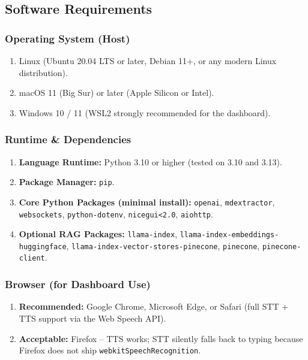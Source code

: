 \documentclass{article}
\begin{document}
\subsection{Software Requirements}

\subsubsection{Operating System (Host)}
\begin{enumerate}[label=\alph*.]
    \item Linux (Ubuntu 20.04 LTS or later, Debian 11+, or any modern Linux distribution).
    \item macOS 11 (Big Sur) or later (Apple Silicon or Intel).
    \item Windows 10 / 11 (WSL2 strongly recommended for the dashboard).
\end{enumerate}

\subsubsection{Runtime \& Dependencies}
\begin{enumerate}[label=\alph*.]
    \item \textbf{Language Runtime:} Python 3.10 or higher (tested on 3.10 and 3.13).
    \item \textbf{Package Manager:} \texttt{pip}.
    \item \textbf{Core Python Packages (minimal install):} \texttt{openai}, \texttt{mdextractor}, \texttt{websockets}, \texttt{python-dotenv}, \texttt{nicegui<2.0}, \texttt{aiohttp}.
    \item \textbf{Optional RAG Packages:} \texttt{llama-index}, \texttt{llama-index-embeddings-huggingface}, \texttt{llama-index-vector-stores-pinecone}, \texttt{pinecone}, \texttt{pinecone-client}.
\end{enumerate}

\subsubsection{Browser (for Dashboard Use)}
\begin{enumerate}[label=\alph*.]
    \item \textbf{Recommended:} Google Chrome, Microsoft Edge, or Safari (full STT + TTS support via the Web Speech API).
    \item \textbf{Acceptable:} Firefox -- TTS works; STT silently falls back to typing because Firefox does not ship \texttt{webkitSpeechRecognition}.
\end{enumerate}
\end{document}
